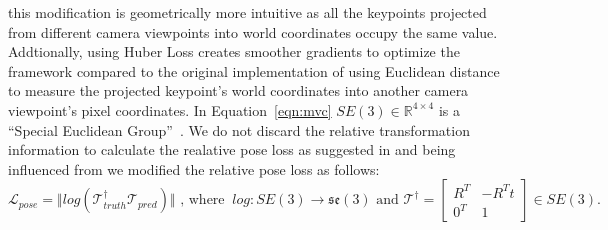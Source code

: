 this modification is geometrically more intuitive as all the keypoints projected from different camera viewpoints into world coordinates occupy the same value.
Addtionally, using Huber Loss creates smoother gradients to optimize the framework compared to the original implementation of
using Euclidean distance to measure the projected keypoint's world coordinates into another camera viewpoint's pixel coordinates.
In Equation~\ref{eqn:mvc} $SE(3) \in \mathbb{R}^{4 \times 4}$ is a ``Special Euclidean Group''~\cite{thurston2014three}.
We do not discard the relative transformation information to calculate the realative pose loss as suggested in \cite{suwajanakorn2018discovery}
and being influenced from \cite{zhao2020learning} we modified the relative pose loss as follows:
\begin{equation}
    \mathcal{L}_{pose} = \Vert log(\mathcal{T}_{truth}^{\dagger} \mathcal{T}_{pred}) \Vert \text{ , where  } \ log: SE(3) \rightarrow \mathfrak{se}(3) \text{ and } \mathcal{T}^{\dagger} = \begin{bmatrix}
        R^T & -R^T t \\
        0^T & 1
    \end{bmatrix} \in SE(3).
\end{equation}





